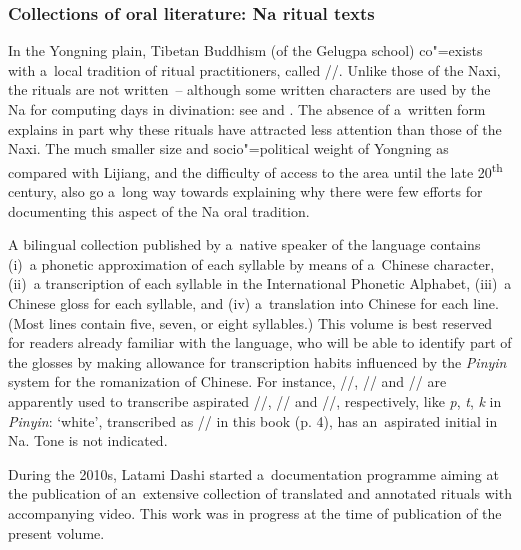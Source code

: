 \subsubsection{Collections of oral literature: Na ritual texts}
\label{sec:collectionsoforalliteraturenaritualtexts}

In the Yongning plain, {Tibetan} Buddhism (of the Gelugpa school) co"=exists with a~local tradition of
ritual practitioners, called //. Unlike those of the
Naxi, the rituals are not written~-- although some written characters are used by the Na for computing days in divination: see
\citet{yang1985} and \citet[163-189]{lidazhu2015}. The absence of a~written form explains in part why these rituals have attracted
less attention than those of the Naxi. The much smaller size and socio"=political weight of Yongning
as compared with Lijiang, and the difficulty of access to the area until the late 20\textsuperscript{th} century, also
go a~long way towards explaining why there were few efforts for documenting this aspect of the
Na {oral tradition}. 

A bilingual collection published by a~native speaker of the language
\citep{azeming2013} contains (i)~a phonetic approximation of each syllable by means of a~Chinese
character, (ii)~a transcription of each syllable in the International Phonetic Alphabet, (iii)~a Chinese gloss for each syllable,
and (iv) a~translation into Chinese for each line. (Most lines contain five, seven, or eight
syllables.) This volume is best reserved for readers already familiar with the language, who will
be able to identify part of the glosses by making allowance for transcription habits influenced by
the \textit{Pinyin} system for the romanization of Chinese. For instance, //, // and
// are apparently used to transcribe aspirated //, // and //,
respectively, like \textit{p}, \textit{t}, \textit{k} in \textit{Pinyin}: ‘white’, transcribed as
// in this book (p. 4), has an~aspirated initial in Na. Tone is not indicated.

During the 2010s, Latami Dashi started a~documentation programme aiming
at the publication of an~extensive collection of translated and annotated rituals with accompanying
video. This work was in progress at the time of publication of the present volume.


